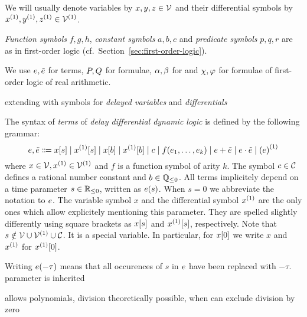     We will usually denote variables by $x,y,z\in\mathcal{V}$ and their differential symbols by $\D{x},\D{y},\D{z}\in\diffvars$.

    \emph{Function symbols} $f,g,h$, \emph{constant symbols} $a,b,c$ and \emph{predicate symbols} $p,q,r$ are as in first-order logic (cf.\ Section~\ref{sec:first-order-logic}).

    We use $e,\tilde{e}$ for \ddL terms, $P,Q$ for \ddL formulae, $\alpha,\beta$ for \dHPs and $\chi,\varphi$ for formulae of first-order logic of real arithmetic.

extending \dL with symbols for \emph{delayed variables} and \emph{differentials}
    \begin{definition}[Terms]\label{def:syntax-terms}
        The syntax of \emph{terms} of \emph{delay differential dynamic logic} is defined by the following grammar:
        \begin{equation*}
            \astrm,\bstrm \Coloneqq
                \x[s] \mid
                \Dx[s] \mid
                \x[b] \mid
                \Dx[b] \mid
                c \mid
                f(\range{\istrm{1}}{\istrm{k}}) \mid
                \astrm + \bstrm \mid
                \astrm \cdot \bstrm \mid
                \D{(\astrm)}
        \end{equation*}
        where $x\in\allvars,\D{x}\in\diffvars$ and $f$ is a function symbol of arity $k$.
        The symbol $c\in\mathcal{C}_{}$ defines a rational number constant and $b\in\mathbb{Q}_{\leq 0}$.
        All terms implicitely depend on a time parameter $s\in\mathbb{R}_{\leq 0}$, written as $e(s)$. When $s=0$ we abbreviate the notation to $e$.
        The variable symbol $x$ and the differential symbol $\D{x}$ are the only ones which allow explicitely mentioning this parameter. They are spelled slightly differently using square brackets as $x[s]$ and $\Dx[s]$, respectively. Note that $s\notin\allvars\cup\diffvars\cup\constants$. It is a special variable.
        In particular, for $x[0]$ we write $x$ and $\D{x}$ for $\Dx[0]$.

        Writing $e(-\tau)$ means that all occurences of $s$ in $e$ have been replaced with $-\tau$.
        parameter is inherited

        allows polynomials,
        division theoretically possible, when can exclude division by zero

    \end{definition}

